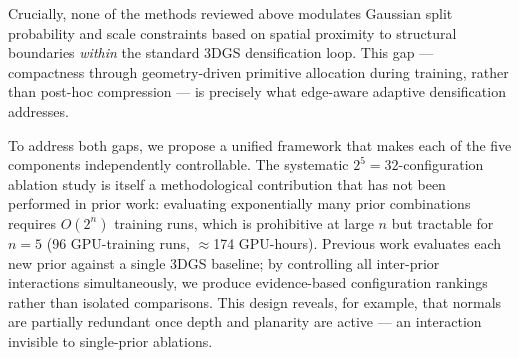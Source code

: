 Crucially, none of the methods reviewed above modulates Gaussian split probability and scale constraints based on spatial proximity to structural boundaries \emph{within} the standard 3DGS densification loop. This gap — compactness through geometry-driven primitive allocation during training, rather than post-hoc compression — is precisely what edge-aware adaptive densification addresses.

To address both gaps, we propose a unified framework that makes each of the five components independently controllable. The systematic $2^5 = 32$-configuration ablation study is itself a methodological contribution that has not been performed in prior work: evaluating exponentially many prior combinations requires $O(2^n)$ training runs, which is prohibitive at large $n$ but tractable for $n=5$ (96 GPU-training runs, $\approx$174 GPU-hours). Previous work evaluates each new prior against a single 3DGS baseline; by controlling all inter-prior interactions simultaneously, we produce evidence-based configuration rankings rather than isolated comparisons. This design reveals, for example, that normals are partially redundant once depth and planarity are active — an interaction invisible to single-prior ablations.
